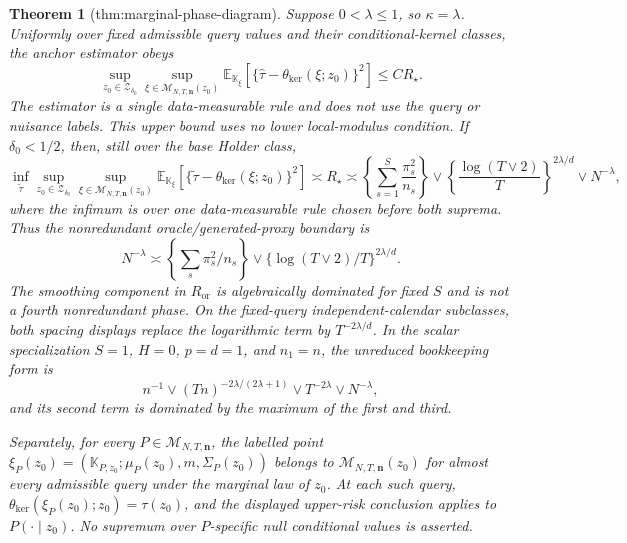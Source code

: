 \documentclass{article}
\newtheorem{theorem}{Theorem}
\begin{document}
\begin{theorem}[thm:marginal-phase-diagram]\label{thm:marginal-phase-diagram}
Suppose \(0<\lambda\le1\), so \(\kappa=\lambda\).  Uniformly over fixed
admissible query values and their conditional-kernel classes, the anchor
estimator obeys
\[
 \sup_{z_0\in\mathcal Z_{\delta_0}}
 \sup_{\xi\in\mathcal M_{N,T,\mathbf n}(z_0)}
 \mathbb E_{\mathbb K_\xi}
 [\{\widehat\tau-\theta_{\mathrm{ker}}(\xi;z_0)\}^2]
 \le CR_\star.
\]
The estimator is a single data-measurable rule and does not use the query or
nuisance labels.  This upper bound uses no lower local-modulus condition.  If
\(\delta_0<1/2\), then, still over the base Holder class,
\[
 \inf_{\widetilde\tau}
 \sup_{z_0\in\mathcal Z_{\delta_0}}
 \sup_{\xi\in\mathcal M_{N,T,\mathbf n}(z_0)}
 \mathbb E_{\mathbb K_\xi}
 [\{\widetilde\tau-\theta_{\mathrm{ker}}(\xi;z_0)\}^2]
 \asymp R_\star
 \asymp
 \left\{\sum_{s=1}^{S}\frac{\pi_s^2}{n_s}\right\}
 \vee\left\{\frac{\log(T\vee2)}{T}\right\}^{2\lambda/d}
 \vee N^{-\lambda},
\]
where the infimum is over one data-measurable rule chosen before both
suprema.  Thus the nonredundant oracle/generated-proxy boundary is
\[
 N^{-\lambda}\asymp
 \left\{\sum_s\pi_s^2/n_s\right\}
 \vee\{\log(T\vee2)/T\}^{2\lambda/d}.
\]
The smoothing component in \(R_{\mathrm{or}}\) is algebraically dominated
for fixed \(S\) and is not a fourth nonredundant phase.  On the fixed-query
independent-calendar subclasses, both spacing displays replace the
logarithmic term by \(T^{-2\lambda/d}\).  In the scalar specialization
\(S=1\), \(H=0\), \(p=d=1\), and \(n_1=n\), the unreduced bookkeeping form is
\[
 n^{-1}\vee(Tn)^{-2\lambda/(2\lambda+1)}
 \vee T^{-2\lambda}\vee N^{-\lambda},
\]
and its second term is dominated by the maximum of the first and third.

Separately, for every \(P\in\mathcal M_{N,T,\mathbf n}\), the labelled point
\(\xi_P(z_0)=(\mathbb K_{P,z_0};\mu_P(z_0),m,\Sigma_P(z_0))\) belongs to
\(\mathcal M_{N,T,\mathbf n}(z_0)\) for almost every admissible query under
the marginal law of \(z_0\).  At each such query,
\(\theta_{\mathrm{ker}}(\xi_P(z_0);z_0)=\tau(z_0)\), and the displayed
upper-risk conclusion applies to \(P(\cdot\mid z_0)\).  No supremum over
\(P\)-specific null conditional values is asserted.
\end{theorem}
\end{document}
